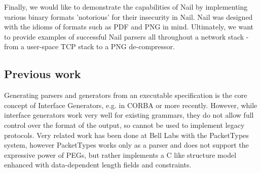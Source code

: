 \documentclass[10pt]{article}
\begin{document}
Finally, we would like to demonstrate the capabilities of Nail by implementing various binary
formats 'notorious' for their insecurity in Nail. Nail was designed with the idioms of formats such
as PDF and PNG in mind. Ultimately, we want to provide examples of successful Nail parsers all
throughout a network stack - from a user-space TCP stack to a PNG de-compressor.

\subsection{Previous work}
Generating parsers and generators from an executable specification is the core concept of Interface
Generators, e.g. in CORBA or more recently\cite{varda2008}. However, while interface
generators work very well for existing grammars, they do not allow full control over the format of
the output, so cannot be used to implement legacy protocols.
Very related work has been done at Bell Labs with the PacketTypes system\cite{mccann2000packet},
however PacketTypes works only as a parser and does not support the expressive power of PEGs, but rather
implements a C like structure model enhanced with data-dependent length fields and constraints.
\begin{comment}

Memory corruption exploits (frequently) rely on placing controlled values at known (or controlled)
memory locations. Exploit countermeasures  like Address-Space Layout Randomisation\cite{pax-aslr},
 heap cookies \cite{heapcookies} or data execution prevention try to make this harder for
 an attacker. Attackers have developed techniques such as heap spraying \cite{heapspray} and heap
 feng shui\cite{fengshui} to help bypass those mitigations. 


Nail parsers use two arena allocators\cite{arena}, one for the temporary syntax tree and one for the
result. If Nail were to use the normal system allocator, the attacker could cause two packets to be
parsed at the same time (or, given a sufficiently complicated input, two structure within the same
grammar to be parsed sequentially) such that the (invalid) intermediate results from one parse,  
 If there is a buffer overflow past the
end of one input, it is much harder for the attacker craft a sequence of packets to trick the allocator into
placing a known value next to that input.

\end{comment}




\end{document}
